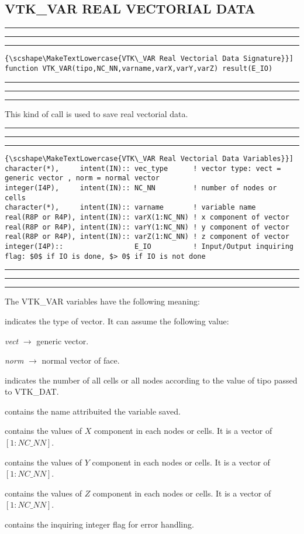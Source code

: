 \documentclass[pagesize=pdftex,fontsize=10pt,paper=a4,oneside]{scrbook}
\DeclareRobustCommand{\MarginNote}[1]{\marginpar{%
\slshape\footnotesize%
\parindent=0pt\lineskip=0pt\lineskiplimit=0pt%
\tolerance=2000\hyphenpenalty=300\exhyphenpenalty=300%
\doublehyphendemerits=100000\finalhyphendemerits=\doublehyphendemerits%
\raggedright\hspace{0pt}#1}}
\newenvironment{boxred}[1]%
               {%
                \noindent\hspace*{-0.025\textwidth}%
                \color{Maroon}%
                \rule[-5.8pt]{0.6pt}{6pt}\hspace*{-0.6pt}\rule{1.05\textwidth}{0.6pt}\hspace*{-0.6pt}\rule[-5.8pt]{0.6pt}{6pt}%
                \color{black}%
                \vspace*{0.6pt}\MarginNote{\color{Maroon}{#1}}%
               }%
               {%
                \noindent\hspace*{-0.025\textwidth}%
                \color{Maroon}%
                \rule[0pt]{0.6pt}{6pt}\hspace*{-0.6pt}\rule{1.05\textwidth}{0.6pt}\hspace*{-0.6pt}\rule[0pt]{0.6pt}{6pt}%
                \color{black}%
                \vspace*{2mm}%
               }
\newenvironment{enumerateABlu}%
{\def\theenumi{\textsc{\EnumFont\color{RoyalBlue}\Alph{enumi}}}%
\enumerate}%
{\endenumerate}
\DeclareRobustCommand{\MaiuscolettoBS}[1]{\textls[80]{\scshape\MakeTextLowercase{#1}}}
\begin{document}
\subsection{VTK\_VAR REAL VECTORIAL DATA}

\begin{boxred}{}
\begin{lstlisting}[style=signature,title=\color{Maroon}\MaiuscolettoBS{VTK\_VAR Real Vectorial Data Signature}]
function VTK_VAR(tipo,NC_NN,varname,varX,varY,varZ) result(E_IO)
\end{lstlisting}
\end{boxred}

This kind of call is used to save real vectorial data.

\begin{boxred}{}
\begin{lstlisting}[style=variables,title=\color{Maroon}\MaiuscolettoBS{VTK\_VAR Real Vectorial Data Variables}]
character(*),     intent(IN):: vec_type      ! vector type: vect = generic vector , norm = normal vector
integer(I4P),     intent(IN):: NC_NN         ! number of nodes or cells
character(*),     intent(IN):: varname       ! variable name
real(R8P or R4P), intent(IN):: varX(1:NC_NN) ! x component of vector
real(R8P or R4P), intent(IN):: varY(1:NC_NN) ! y component of vector
real(R8P or R4P), intent(IN):: varZ(1:NC_NN) ! z component of vector
integer(I4P)::                 E_IO          ! Input/Output inquiring flag: $0$ if IO is done, $> 0$ if IO is not done
\end{lstlisting}
\end{boxred}

The VTK\_VAR variables have the following meaning:

\begin{description}
 \item [{\color{RoyalBlue}tipo}] indicates the type of vector. It can assume the following value:
 \begin{enumerateABlu}
  \item \emph{vect} $\rightarrow$ generic vector.
  \item \emph{norm} $\rightarrow$ normal vector of face.
 \end{enumerateABlu}
 \item[{\color{RoyalBlue}NC\_NN}] indicates the number of all cells or all nodes according to the value of
                                  {\color{RoyalBlue}tipo} passed to VTK\_DAT.
 \item[{\color{RoyalBlue}varname}] contains the name attribuited the variable saved.
 \item[{\color{RoyalBlue}varX}] contains the values of $X$ component in each nodes or cells. It is a vector of $[1:NC\_NN]$.
 \item[{\color{RoyalBlue}varY}] contains the values of $Y$ component in each nodes or cells. It is a vector of $[1:NC\_NN]$.
 \item[{\color{RoyalBlue}varZ}] contains the values of $Z$ component in each nodes or cells. It is a vector of $[1:NC\_NN]$.
 \item[{\color{RoyalBlue}E\_IO}] contains the inquiring integer flag for error handling.
\end{description}
\end{document}
